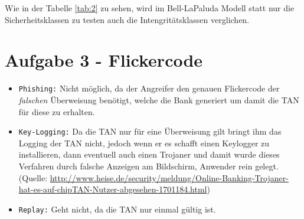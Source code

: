 \documentclass{scrartcl}
\begin{document}
Wie in der Tabelle \ref{tab:2} zu sehen, wird im Bell-LaPaluda Modell statt nur die Sicherheitsklassen zu testen auch die Intengritätsklassen verglichen.

\section*{Aufgabe 3 - Flickercode}

\begin{itemize}
\item \texttt{Phishing:} Nicht möglich, da der Angreifer den genauen Flickercode der \textit{falschen} Überweisung benötigt, welche die Bank generiert um damit die TAN für diese zu erhalten.  
\item \texttt{Key-Logging:} Da die TAN nur für eine Überweisung gilt bringt ihm das Logging der TAN nicht, jedoch wenn er es schafft einen Keylogger zu installieren, dann eventuell auch einen Trojaner und damit wurde dieses Verfahren durch falsche Anzeigen am Bildschirm, Anwender rein gelegt. (Quelle: \url{http://www.heise.de/security/meldung/Online-Banking-Trojaner-hat-es-auf-chipTAN-Nutzer-abgesehen-1701184.html})
\item \texttt{Replay:} Geht nicht, da die TAN nur einmal gültig ist.
\end{itemize}
\end{document}
